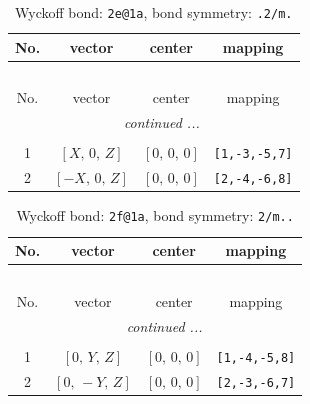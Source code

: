 \documentclass[fleqn,8pt]{jsarticle}
\begin{document}
\begin{longtable}{cccc}
\caption{Wyckoff bond: {\tt 2e@1a}, bond symmetry: {\tt .2/m.}}
 \\
 \hline \hline
No. & vector & center & mapping \\ \hline \endfirsthead

\multicolumn{3}{l}{\tablename\ \thetable{}} \\
 \hline \hline
No. & vector & center & mapping \\ \hline \endhead

 \hline \hline
\multicolumn{3}{r}{\footnotesize\it continued ...} \\ \endfoot

 \hline \hline
\multicolumn{3}{r}{} \\ \endlastfoot

1 & $\left[ X,\, 0,\, Z \right]$ & $\left[ 0,\, 0,\, 0 \right]$ & {\tt [1,-3,-5,7]} \\ \hline
2 & $\left[ - X,\, 0,\, Z \right]$ & $\left[ 0,\, 0,\, 0 \right]$ & {\tt [2,-4,-6,8]} \\
\end{longtable}
\renewcommand{\arraystretch}{1.2}
\begin{longtable}{cccc}
\caption{Wyckoff bond: {\tt 2f@1a}, bond symmetry: {\tt 2/m..}}
 \\
 \hline \hline
No. & vector & center & mapping \\ \hline \endfirsthead

\multicolumn{3}{l}{\tablename\ \thetable{}} \\
 \hline \hline
No. & vector & center & mapping \\ \hline \endhead

 \hline \hline
\multicolumn{3}{r}{\footnotesize\it continued ...} \\ \endfoot

 \hline \hline
\multicolumn{3}{r}{} \\ \endlastfoot

1 & $\left[ 0,\, Y,\, Z \right]$ & $\left[ 0,\, 0,\, 0 \right]$ & {\tt [1,-4,-5,8]} \\ \hline
2 & $\left[ 0,\, - Y,\, Z \right]$ & $\left[ 0,\, 0,\, 0 \right]$ & {\tt [2,-3,-6,7]} \\
\end{longtable}
\renewcommand{\arraystretch}{1.2}
\end{document}
